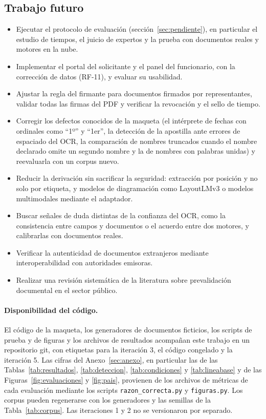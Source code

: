 \documentclass[11pt,a4paper]{article}
\begin{document}
\subsection{Trabajo futuro}
\begin{itemize}
  \item Ejecutar el protocolo de evaluación (sección~\ref{sec:pendiente}), en particular el estudio de tiempos, el juicio de expertos y la prueba con documentos reales y motores en la nube.
  \item Implementar el portal del solicitante y el panel del funcionario, con la corrección de datos (RF-11), y evaluar su usabilidad.
  \item Ajustar la regla del firmante para documentos firmados por representantes, validar todas las firmas del PDF y verificar la revocación y el sello de tiempo.
  \item Corregir los defectos conocidos de la maqueta (el intérprete de fechas con ordinales como ``1º'' y ``1er'', la detección de la apostilla ante errores de espaciado del OCR, la comparación de nombres truncados cuando el nombre declarado omite un segundo nombre y la de nombres con palabras unidas) y reevaluarla con un corpus nuevo.
  \item Reducir la derivación sin sacrificar la seguridad: extracción por posición y no solo por etiqueta, y modelos de diagramación como LayoutLMv3 o modelos multimodales mediante el adaptador.
  \item Buscar señales de duda distintas de la confianza del OCR, como la consistencia entre campos y documentos o el acuerdo entre dos motores, y calibrarlas con documentos reales.
  \item Verificar la autenticidad de documentos extranjeros mediante interoperabilidad con autoridades emisoras.
  \item Realizar una revisión sistemática de la literatura sobre prevalidación documental en el sector público.
\end{itemize}

\paragraph{Disponibilidad del código.} El código de la maqueta, los generadores de documentos ficticios, los scripts de prueba y de figuras y los archivos de resultados acompañan este trabajo en un repositorio git, con etiquetas para la iteración 3, el código congelado y la iteración 5. Las cifras del Anexo~\ref{sec:anexo}, en particular las de las Tablas~\ref{tab:resultados}, \ref{tab:deteccion}, \ref{tab:condiciones} y \ref{tab:lineabase} y de las Figuras~\ref{fig:evaluaciones} y \ref{fig:pais}, provienen de los archivos de métricas de cada evaluación mediante los scripts \texttt{razon\_correcta.py} y \texttt{figuras.py}. Los corpus pueden regenerarse con los generadores y las semillas de la Tabla~\ref{tab:corpus}. Las iteraciones 1 y 2 no se versionaron por separado.
\end{document}
